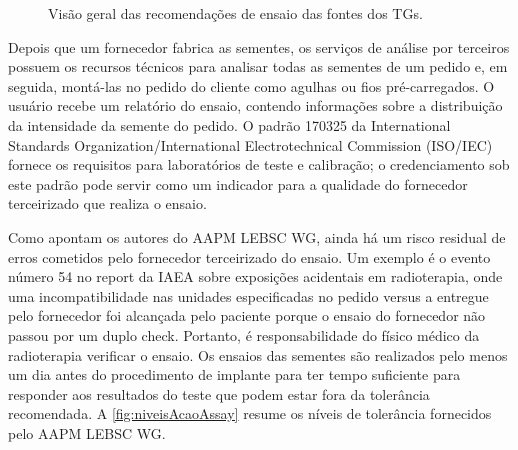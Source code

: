 \documentclass[11pt,a4paper]{article}
\newcounter{exemplo}
\begin{document}
	\begin{figure}[h]
		\centering
		\caption{Visão geral das recomendações de ensaio das fontes dos TGs.}
		\label{fig:recomendacoesAssay}
	\end{figure}

	Depois que um fornecedor fabrica as sementes, os serviços de análise por terceiros possuem os recursos técnicos para analisar todas as sementes de um pedido e, em seguida, montá-las no pedido do cliente como agulhas ou fios pré-carregados. O usuário recebe um relatório do ensaio, contendo informações  sobre a distribuição da intensidade da semente do pedido. O padrão 170325 da International Standards Organization/International Electrotechnical Commission (ISO/IEC) fornece os requisitos para laboratórios de teste e calibração; o credenciamento sob este padrão pode servir como um indicador para a qualidade do fornecedor terceirizado que realiza o ensaio. 

	Como apontam os autores do AAPM LEBSC WG, ainda há um risco residual de erros cometidos pelo fornecedor terceirizado do ensaio. Um exemplo é o evento número 54 no report da IAEA sobre exposições acidentais em radioterapia, onde uma incompatibilidade nas unidades especificadas no pedido versus a entregue pelo fornecedor foi alcançada pelo paciente porque o ensaio do fornecedor não passou por um duplo check. Portanto, é responsabilidade do físico médico da radioterapia verificar o ensaio. Os ensaios das sementes são realizados pelo menos um dia antes do procedimento de implante para ter tempo suficiente para responder aos resultados do teste que podem estar fora da tolerância recomendada. A \ref{fig:niveisAcaoAssay} resume os níveis de tolerância fornecidos pelo AAPM LEBSC WG.
\end{document}

